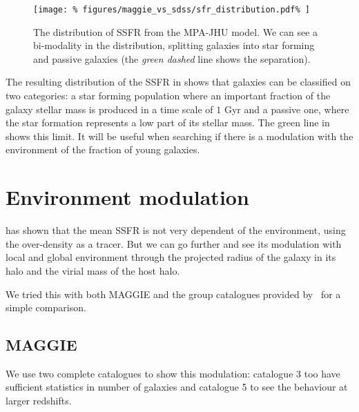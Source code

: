 \begin{figure}[htb]
    \centering
    \texttt{[image: \%
        figures/maggie\_vs\_sdss/sfr\_distribution.pdf\%
    ]}
    \caption{The distribution of SSFR from the MPA-JHU model. We can see a
    bi-modality in the distribution, splitting galaxies into star forming
and passive galaxies (the \emph{green dashed} line shows the
separation).\label{fig:ssfr_distribution}}
\end{figure}

The resulting distribution of the SSFR in 
shows that galaxies can be classified on two categories: a star forming
population where an important fraction of the galaxy stellar mass is
produced in a time scale of $1$ Gyr and a passive one, where the star
formation represents a low part of its stellar mass. The green line in
 shows this limit. It will be useful when
searching if there is a modulation with the environment of the fraction of
young galaxies.

\section{Environment modulation}
\label{sec:environment_modulation}

\cite{Peng+10} has shown that the mean SSFR is not very dependent of the
environment, using the over-density as a tracer. But we can go further and
see its modulation with local and global environment through the projected
radius of the galaxy in its halo and the virial mass of the host halo.

We tried this with both MAGGIE and the group catalogues provided
by~\cite{Tempel+14} for a simple comparison.

\subsection{MAGGIE}
\label{sub:ssfr_maggie}

We use two complete catalogues to show this modulation: catalogue 3 too have
sufficient statistics in number of galaxies and catalogue 5 to see the
behaviour at larger redshifts.

